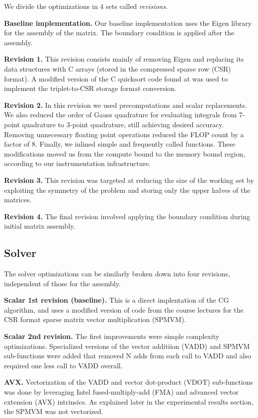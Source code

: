 \documentclass[letterpaper]{article}
\newcommand{\mypar}[1]{{\bf #1.}}
\begin{document}
We divide the optimizations in 4 sets called \textit{revisions}.

\mypar{Baseline implementation}
Our baseline implementation uses the Eigen library for the assembly of the matrix.
The boundary condition is applied after the assembly.

\mypar{Revision 1}
This revision consists mainly of removing Eigen and replacing its data structures with
C arrays (stored in the compressed sparse row (CSR) format).
A modified version of the C quicksort code found at \cite{quickSort} was used to implement the triplet-to-CSR storage format conversion.

\mypar{Revision 2}
In this revision we used precomputations and scalar replacements.
We also reduced the order of Gauss quadrature for evaluating integrals from 7-point quadrature to 3-point quadrature,
still achieving desired accuracy.
Removing unnecessary floating point operations reduced the FLOP count by a factor of 8. 
Finally, we inlined simple and frequently called functions.
These modifications moved us from the compute bound to the memory bound region,
according to our instrumentation infrastructure.

\mypar{Revision 3}
This revision was targeted at reducing the size of the working set by exploiting the symmetry of the problem and storing only the upper halves of the matrices.

\mypar{Revision 4}
The final revision involved applying the boundary condition during initial matrix assembly.

\subsection{Solver}\label{subsec:solver}

The solver optimizations can be similarly broken down into four revisions, independent of those for the assembly.

\mypar{Scalar 1st revision (baseline)}
This is a direct implentation of the CG algorithm, and uses a modified version of code from the course lectures \cite{SPMVM} for the CSR format sparse matrix vector multiplication (SPMVM).

\mypar{Scalar 2nd revision}
The first improvements were simple complexity optimizations. Specialized versions of the vector additiion (VADD) and SPMVM sub-functions were added that removed N adds from each call to VADD and also required one less call to VADD overall.

\mypar{AVX}
Vectorization of the VADD and vector dot-product (VDOT) sub-functions was done by leveraging Intel fused-multiply-add (FMA) and advanced vector extension (AVX) intrinsics. As explained later in the experimental results section, the SPMVM was not vectorized.
\end{document}
